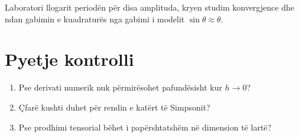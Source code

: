 \begin{lidhje}
Laboratori llogarit periodën për disa amplituda, kryen studim konvergjence dhe ndan gabimin e kuadraturës nga gabimi i modelit $\sin\theta\approx\theta$.
\end{lidhje}

\section*{Pyetje kontrolli}
\begin{enumerate}
\item Pse derivati numerik nuk përmirësohet pafundësisht kur $h\to0$?
\item Çfarë kushti duhet për rendin e katërt të Simpsonit?
\item Pse prodhimi tensorial bëhet i papërshtatshëm në dimension të lartë?
\end{enumerate}



